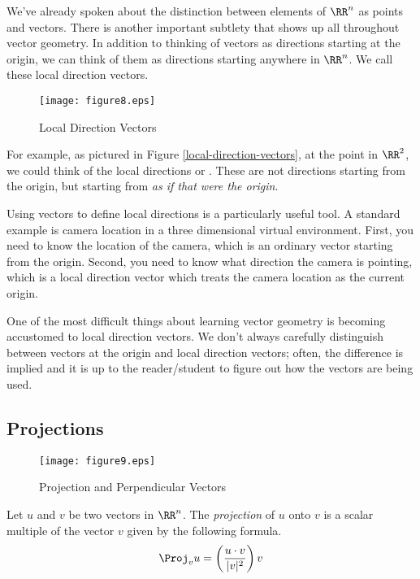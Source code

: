 \documentclass[fleqn]{report}
\begin{document}
We've already spoken about the distinction between elements of
$\RR^n$ as points and vectors. There is another important
subtlety that shows up all throughout vector geometry. In
addition to thinking of vectors as directions starting at the
origin, we can think of them as directions starting anywhere
in $\RR^n$. We call these local direction vectors.

\begin{figure}[t]
\centering
\texttt{[image: figure8.eps]}
\caption{Local Direction Vectors}
\label{local-direction-vectors-diagram}
\end{figure}

For example, as pictured in Figure 
\ref{local-direction-vectors}, at the point
 in $\RR^2$, we could think
of the local directions  or
. These are not directions
starting from the origin, but starting from
 \emph{as if that were the
origin}. 

Using vectors to define local directions is a particularly
useful tool. A standard example is camera location in a three
dimensional virtual environment. First, you need to know the
location of the camera, which is an ordinary vector starting
from the origin. Second, you need to know what direction the
camera is pointing, which is a local direction vector which
treats the camera location as the current origin.

One of the most difficult things about learning vector geometry
is becoming accustomed to local direction vectors. We don't
always carefully distinguish between vectors at the origin and
local direction vectors; often, the difference is implied and
it is up to the reader/student to figure out how the vectors
are being used. 

\subsection{Projections}
\label{projections}

\begin{figure}[t]
\centering
\texttt{[image: figure9.eps]}
\caption{Projection and Perpendicular Vectors}
\label{projections-diagram} 
\end{figure}

\begin{defn}
Let $u$ and $v$ be two vectors in $\RR^n$. The
\emph{projection} of
$u$ onto $v$ is a scalar multiple of the vector $v$ given by
the following formula.
\begin{equation*}
\Proj_v u = \left( \frac{u \cdot v}{|v|^2} \right) v
\end{equation*}
\end{defn}
\end{document}
